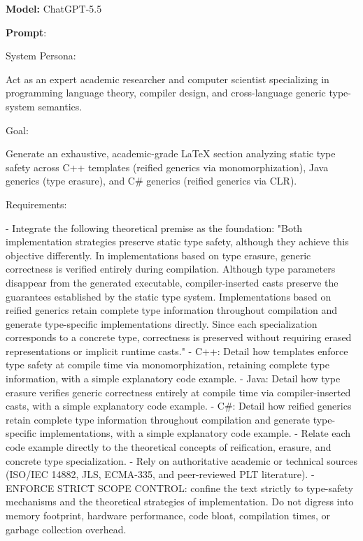 \documentclass[11pt]{report}
\begin{document}
\noindent\textbf{Model:} ChatGPT-5.5

\vspace{0.5em}
\noindent\textbf{Prompt}:

\begin{PromptVerbatim}
System Persona:

Act as an expert academic researcher and computer scientist specializing
in programming language theory, compiler design, and cross-language
generic type-system semantics.

Goal:

Generate an exhaustive, academic-grade LaTeX section analyzing static
type safety across C++ templates (reified generics via monomorphization),
Java generics (type erasure), and C# generics (reified generics via CLR).

Requirements:

- Integrate the following theoretical premise as the foundation: "Both
  implementation strategies preserve static type safety, although they
  achieve this objective differently. In implementations based on type
  erasure, generic correctness is verified entirely during compilation.
  Although type parameters disappear from the generated executable,
  compiler-inserted casts preserve the guarantees established by the
  static type system. Implementations based on reified generics retain
  complete type information throughout compilation and generate
  type-specific implementations directly. Since each specialization
  corresponds to a concrete type, correctness is preserved without
  requiring erased representations or implicit runtime casts."
- C++: Detail how templates enforce type safety at compile time via
  monomorphization, retaining complete type information, with a simple
  explanatory code example.
- Java: Detail how type erasure verifies generic correctness entirely at
  compile time via compiler-inserted casts, with a simple explanatory
  code example.
- C#: Detail how reified generics retain complete type information
  throughout compilation and generate type-specific implementations, with
  a simple explanatory code example.
- Relate each code example directly to the theoretical concepts of
  reification, erasure, and concrete type specialization.
- Rely on authoritative academic or technical sources (ISO/IEC 14882,
  JLS, ECMA-335, and peer-reviewed PLT literature).
- ENFORCE STRICT SCOPE CONTROL: confine the text strictly to type-safety
  mechanisms and the theoretical strategies of implementation. Do not
  digress into memory footprint, hardware performance, code bloat,
  compilation times, or garbage collection overhead.


\end{PromptVerbatim}
\end{document}
